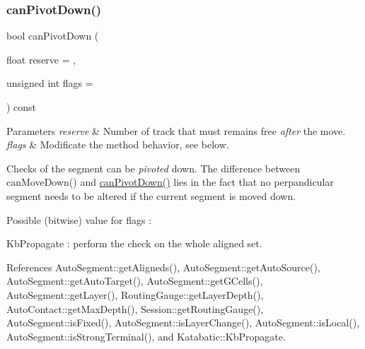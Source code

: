 \mbox{\label{classKatabatic_1_1AutoSegment_a24de580d1a371b8d27640cbc3431990b}} 
\subsubsection{\texorpdfstring{can\+Pivot\+Down()}{canPivotDown()}}
{\footnotesize\ttfamily bool can\+Pivot\+Down (\begin{DoxyParamCaption}\item[{float}]{reserve = {},  }\item[{unsigned int}]{flags = {} }\end{DoxyParamCaption}) const}


\begin{DoxyParams}{Parameters}
{\em reserve} & Number of track that must remains free {\itshape after} the move. \\
\hline
{\em flags} & Modificate the method behavior, see below.\\
\hline
\end{DoxyParams}
Checks of the segment can be {\itshape pivoted} down. The difference between {\ttfamily can\+Move\+Down()} and {\ttfamily \mbox{\hyperlink{classKatabatic_1_1AutoSegment_a24de580d1a371b8d27640cbc3431990b}{can\+Pivot\+Down()}}} lies in the fact that no perpandicular segment needs to be altered if the current segment is moved down.

Possible (bitwise) value for {\ttfamily flags} \+:
\begin{DoxyItemize}
\item {\ttfamily Kb\+Propagate} \+: perform the check on the whole aligned set. 
\end{DoxyItemize}

References Auto\+Segment\+::get\+Aligneds(), Auto\+Segment\+::get\+Auto\+Source(), Auto\+Segment\+::get\+Auto\+Target(), Auto\+Segment\+::get\+G\+Cells(), Auto\+Segment\+::get\+Layer(), Routing\+Gauge\+::get\+Layer\+Depth(), Auto\+Contact\+::get\+Max\+Depth(), Session\+::get\+Routing\+Gauge(), Auto\+Segment\+::is\+Fixed(), Auto\+Segment\+::is\+Layer\+Change(), Auto\+Segment\+::is\+Local(), Auto\+Segment\+::is\+Strong\+Terminal(), and Katabatic\+::\+Kb\+Propagate.

\mbox{\label{classKatabatic_1_1AutoSegment_adec088de3c4c47a28ee9d58eb6d9cf85}} 
